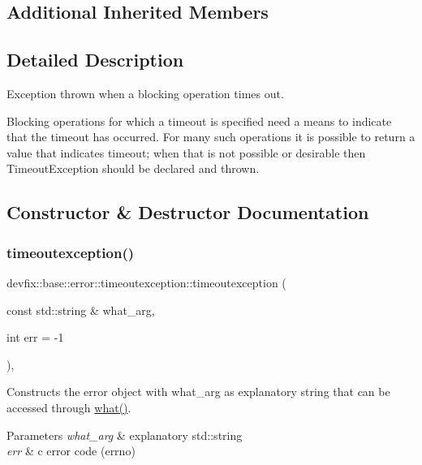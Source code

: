 \subsection*{Additional Inherited Members}


\subsection{Detailed Description}
Exception thrown when a blocking operation times out. 

Blocking operations for which a timeout is specified need a means to indicate that the timeout has occurred. For many such operations it is possible to return a value that indicates timeout; when that is not possible or desirable then Timeout\+Exception should be declared and thrown. 

\subsection{Constructor \& Destructor Documentation}
\mbox{\label{structdevfix_1_1base_1_1error_1_1timeoutexception_abb684b432a5367385d8f975898226c8d}} 
\subsubsection{\texorpdfstring{timeoutexception()}{timeoutexception()}\hspace{0.1cm}{\footnotesize\ttfamily [1/2]}}
{\footnotesize\ttfamily devfix\+::base\+::error\+::timeoutexception\+::timeoutexception (\begin{DoxyParamCaption}\item[{const std\+::string \&}]{what\+\_\+arg,  }\item[{int}]{err = {\ttfamily -\/1} }\end{DoxyParamCaption})\hspace{0.3cm}{\ttfamily [inline]}, {\ttfamily [explicit]}}

Constructs the error object with what\+\_\+arg as explanatory string that can be accessed through \hyperlink{structdevfix_1_1base_1_1error_1_1baseexception_a16327152a55d65b1e537825231fbd452}{what()}. 
\begin{DoxyParams}{Parameters}
{\em what\+\_\+arg} & explanatory std\+::string \\
\hline
{\em err} & c error code (errno) \\
\hline
\end{DoxyParams}
\mbox{\label{structdevfix_1_1base_1_1error_1_1timeoutexception_a7096cca05d73ac6da75746d1737e1ec1}} 

